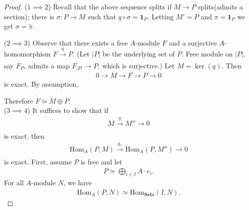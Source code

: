 \documentclass[12pt]{report}
\theoremstyle{plain}
\theoremstyle{remark}
\theoremstyle{definition}
\newcommand{\Hom}[3]{\mathrm{Hom}_{#3}(#1,#2)}
\begin{document}
\begin{proof}
    ($1\implies 2$) Recall that the above sequence splits if $M\rightarrow P$ splits(admits a section); there is $\sigma:P\rightarrow M$ such that $q\circ \sigma=\mathbf{1}_{P}$. Letting $M'=P$ and $\pi=\mathbf{1}_P$ we get $\sigma=\tilde{\pi}$.
    \begin{figure}[H]
        \centering
    \end{figure}
    \noindent ($2\implies 3$) Observe that there exists a free $A$-module $F$ and a surjective $A$-homomorphism $F\xrightarrow[]{q}P$. (Let $|P|$ be the underlying set of $P$. Free module on $|P|$, say $F_{P}$, admits a map $F_{|P|}\rightarrow P$, which is surjective.) Let $M=\ker(q)$. Then
    \begin{align*}
        0\rightarrow M\rightarrow F\rightarrow P\rightarrow 0
    \end{align*}
    is exact. By assumption,
    \begin{figure}[H]
        \centering
    \end{figure}
    \noindent Therefore $F\simeq M\oplus P$. \\
    ($3\implies 4$) It suffices to show that if
    \begin{align*}
        M\xrightarrow[]{q}M''\rightarrow 0
    \end{align*}
    is exact, then
    \begin{align*}
        \Hom{P}{M}{A}\xrightarrow[]{q_*}\Hom{P}{M''}{A}\rightarrow 0
    \end{align*}
    is exact. First, assume $P$ is free and let
    \begin{align*}
        P\simeq \bigoplus_{i\in I} A\cdot e_i.
    \end{align*}
    For all $A$-module $N$, we have
    \begin{align*}
        \Hom{P}{N}{A}\simeq \Hom{I}{N}{\mathbf{Sets}}.

\end{align*}
\end{proof}
\end{document}
